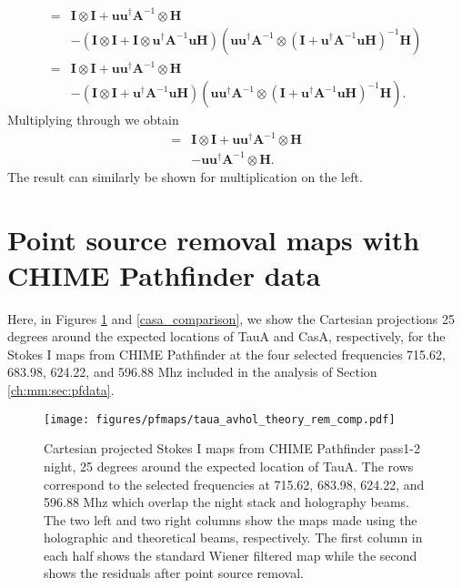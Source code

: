 \begin{align}
=& \mathbf{I} \otimes \mathbf{I} + \mathbf{u}\mathbf{u}^\dagger\mathbf{A}^{-1} \otimes \mathbf{H} 
\\ \nonumber &- \left( \mathbf{I} \otimes \mathbf{I} + \mathbf{I} \otimes \mathbf{u}^\dagger\mathbf{A}^{-1}\mathbf{u} \mathbf{H}\right)
 \left( \mathbf{u}\mathbf{u}^\dagger\mathbf{A}^{-1} \otimes \left(\mathbf{I} + \mathbf{u}^\dagger\mathbf{A}^{-1}\mathbf{u}\mathbf{H}\right)^{-1} \mathbf{H}\right)
\\ =& \mathbf{I} \otimes \mathbf{I} + \mathbf{u}\mathbf{u}^\dagger\mathbf{A}^{-1} \otimes \mathbf{H} 
\\ \nonumber &- \left( \mathbf{I} \otimes \mathbf{I} + \mathbf{u}^\dagger\mathbf{A}^{-1}\mathbf{u} \mathbf{H} \right)
 \left( \mathbf{u}\mathbf{u}^\dagger\mathbf{A}^{-1} \otimes \left(\mathbf{I} + \mathbf{u}^\dagger\mathbf{A}^{-1}\mathbf{u}\mathbf{H}\right)^{-1} \mathbf{H}\right).
 \end{align}
 Multiplying through we obtain
 \begin{align}
 =& \mathbf{I} \otimes \mathbf{I} + \mathbf{u}\mathbf{u}^\dagger\mathbf{A}^{-1} \otimes \mathbf{H} \nonumber 
\\ &- \mathbf{u}\mathbf{u}^\dagger\mathbf{A}^{-1} \otimes \mathbf{H}.
\end{align}
The result can similarly be shown for multiplication on the left.

\section{Point source removal maps with CHIME Pathfinder data}
\label{app:mm:sec:pfdata}

Here, in Figures \ref{taua_comparison}  and \ref{casa_comparison}, we show the Cartesian projections 25 degrees around the expected locations of TauA and CasA, respectively, for the Stokes I maps from CHIME Pathfinder at the four selected frequencies 715.62, 683.98, 624.22, and 596.88 Mhz included in the analysis of Section \ref{ch:mm:sec:pfdata}.

\begin{figure}
\centering
\texttt{[image: figures/pfmaps/taua\_avhol\_theory\_rem\_comp.pdf]}
\caption{Cartesian projected Stokes I maps from CHIME Pathfinder pass1-2 night, 25 degrees around the expected location of TauA. The rows correspond to the selected frequencies at 715.62, 683.98, 624.22, and 596.88 Mhz which overlap the night stack and holography beams. The two left and two right columns show the maps made using the holographic and theoretical beams, respectively. The first column in each half shows the standard Wiener filtered map while the second shows the residuals after point source removal.}
\label{taua_comparison}
\end{figure}

